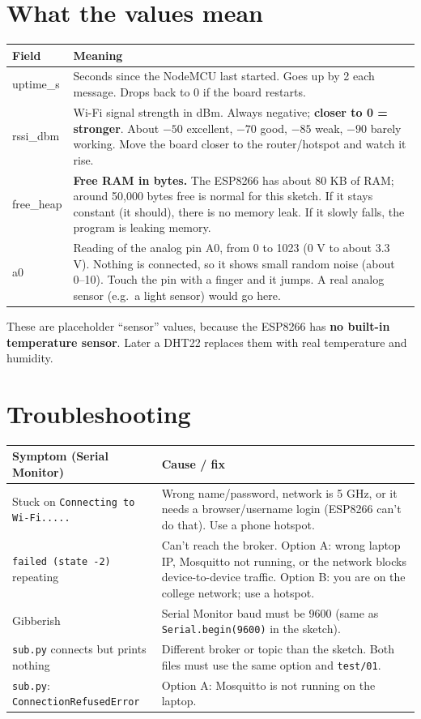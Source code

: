 \documentclass[11pt]{article}
\begin{document}
\section*{What the values mean}
\begin{tabular}{@{}>{\ttfamily}l >{\raggedright\arraybackslash}p{13cm}@{}}
\toprule
\textrm{\textbf{Field}} & \textbf{Meaning} \\
\midrule
uptime\_s & Seconds since the NodeMCU last started. Goes up by 2 each message. Drops back to 0 if the board restarts. \\
rssi\_dbm & Wi-Fi signal strength in dBm. Always negative; \textbf{closer to 0 = stronger}.
About $-50$ excellent, $-70$ good, $-85$ weak, $-90$ barely working. Move the board closer to the router/hotspot and watch it rise. \\
free\_heap & \textbf{Free RAM in bytes.} The ESP8266 has about 80 KB of RAM; around 50{,}000 bytes free is normal for this sketch.
If it stays constant (it should), there is no memory leak. If it slowly falls, the program is leaking memory. \\
a0 & Reading of the analog pin A0, from 0 to 1023 (0 V to about 3.3 V). Nothing is connected, so it shows small random noise (about 0--10).
Touch the pin with a finger and it jumps. A real analog sensor (e.g.\ a light sensor) would go here. \\
\bottomrule
\end{tabular}

\vspace{6pt}
These are placeholder ``sensor'' values, because the ESP8266 has \textbf{no built-in temperature sensor}. Later a DHT22 replaces them with real temperature and humidity.

\section*{Troubleshooting}
\begin{tabular}{@{}>{\raggedright}p{5.6cm} >{\raggedright\arraybackslash}p{10.6cm}@{}}
\toprule
\textbf{Symptom (Serial Monitor)} & \textbf{Cause / fix} \\
\midrule
Stuck on \texttt{Connecting to Wi-Fi.....} & Wrong name/password, network is 5 GHz, or it needs a browser/username login (ESP8266 can't do that). Use a phone hotspot. \\
\texttt{failed (state -2)} repeating & Can't reach the broker. Option A: wrong laptop IP, Mosquitto not running, or the network blocks device-to-device traffic. Option B: you are on the college network; use a hotspot. \\
Gibberish & Serial Monitor baud must be 9600 (same as \texttt{Serial.begin(9600)} in the sketch). \\
\texttt{sub.py} connects but prints nothing & Different broker or topic than the sketch. Both files must use the same option and \texttt{test/01}. \\
\texttt{sub.py}: \texttt{ConnectionRefusedError} & Option A: Mosquitto is not running on the laptop. \\
\bottomrule
\end{tabular}
\end{document}
